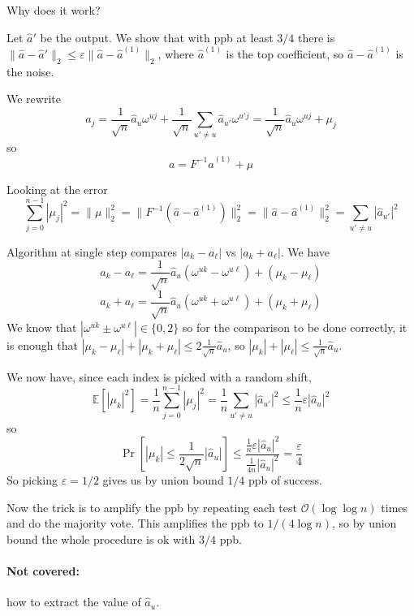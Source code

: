 \documentclass[11pt]{article}
\newcommand{\E}{{\mathbb E}}
\newcommand{\bigo}{\mathcal{O}}
\begin{document}
Why does it work?

Let $\hat{a}'$ be the output. We show that with ppb at least $3/4$ there is $\|\hat{a} - \hat{a}'\|_2 \le \varepsilon \|\hat{a} - \hat{a}^{(1)}\|_2$, where $\hat{a}^{(1)}$ is the top coefficient, so $\hat{a} - \hat{a}^{(1)}$ is the noise.

We rewrite 
$$a_j = \frac{1}{\sqrt{n}}\hat{a}_u \omega^{uj} +  \frac{1}{\sqrt{n}}\sum_{u' \not= u} \hat{a}_{u'} \omega^{u'j} =   \frac{1}{\sqrt{n}}\hat{a}_u \omega^{uj} + \mu_j$$
so
$$a = F^{-1}\hat{a}^{(1)} + \mu$$

Looking at the error
$$\sum_{j=0}^{n-1} |\mu_j|^2 = \|\mu\|_2^2 = \|F^{-1}(\hat{a} - \hat{a}^{(1)})\|_2^2 = \| \hat{a} - \hat{a}^{(1)}\|_2^2 = \sum_{u' \not= u} |\hat{a}_{u'}|^2$$

Algorithm at single step compares $|a_{k} - a_{\ell}|$ vs $|a_{k} + a_\ell|$.
We have
$$a_k - a_\ell = \frac{1}{\sqrt{n}}\hat{a}_u(\omega^{uk} - \omega^{u\ell}) + (\mu_{k} - \mu_{\ell})$$
$$a_k + a_\ell = \frac{1}{\sqrt{n}}\hat{a}_u(\omega^{uk} + \omega^{u\ell}) + (\mu_{k} + \mu_{\ell})$$
We know that $|\omega^{uk} \pm \omega^{u\ell}| \in \{0,2\}$ so for the comparison to be done correctly, it is enough that $|\mu_k - \mu_\ell| + |\mu_k + \mu_\ell| \le 2 \frac{1}{\sqrt{n}} \hat{a}_u$, so $|\mu_k| + |\mu_\ell| \le \frac{1}{\sqrt{n}}\hat{a}_u$. 

We now have, since each index is picked with a random shift,
$$\E[|\mu_k|^2]  = \frac{1}{n} \sum_{j=0}^{n-1} |\mu_j|^2 = \frac{1}{n} \sum_{u' \not= u} |\hat{a}_{u'}|^2 \le \frac{1}{n} \varepsilon |\hat{a}_u|^2$$
so 
$$\Pr[|\mu_k| \le \frac{1}{2 \sqrt{n}} |\hat{a}_u|] \le  \frac{\frac1n \varepsilon |\hat{a}_u|^2}{\frac{1}{4n} |\hat{a}_u|^2} = \frac{\varepsilon}{4}$$
So picking $\varepsilon=1/2$ gives us by union bound $1/4$ ppb of success.

Now the trick is to amplify the ppb by repeating each test $\bigo(\log \log n)$ times and do the majority vote. This amplifies the ppb to $1/(4 \log n)$, so by union bound the whole procedure is ok with $3/4$ ppb.

\paragraph{Not covered:} how to extract the value of $\hat{a}_u$.




\end{document}
